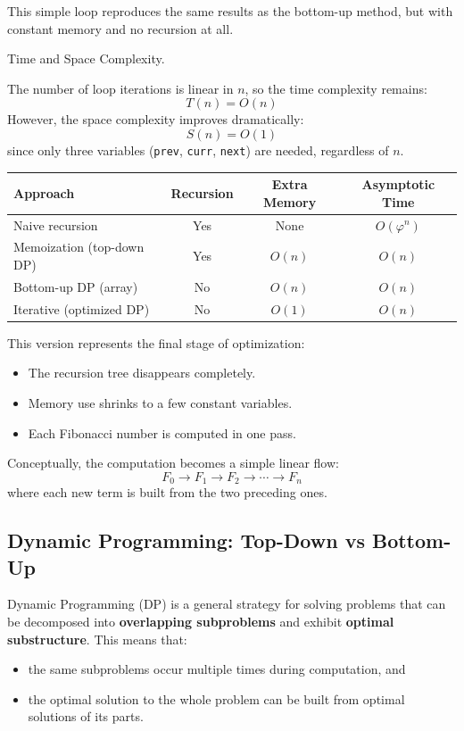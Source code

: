 \documentclass{article}
\begin{document}
This simple loop reproduces the same results as the bottom-up method,
but with constant memory and no recursion at all.

Time and Space Complexity.

The number of loop iterations is linear in $n$,
so the time complexity remains:
\[
	T(n) = O(n)
\]
However, the space complexity improves dramatically:
\[
	S(n) = O(1)
\]
since only three variables (\texttt{prev}, \texttt{curr}, \texttt{next}) are needed, regardless of $n$.

\begin{center}
	\begin{tabular}{lccc}
		\toprule
		\textbf{Approach} & \textbf{Recursion} & \textbf{Extra Memory} & \textbf{Asymptotic Time} \\
		\midrule
		Naive recursion & Yes & None & $O(\varphi^n)$ \\
		Memoization (top-down DP) & Yes & $O(n)$ & $O(n)$ \\
		Bottom-up DP (array) & No & $O(n)$ & $O(n)$ \\
		Iterative (optimized DP) & No & $O(1)$ & $O(n)$ \\
		\bottomrule
	\end{tabular}
\end{center}

This version represents the final stage of optimization:
\begin{itemize}
	\item The recursion tree disappears completely.
	\item Memory use shrinks to a few constant variables.
	\item Each Fibonacci number is computed in one pass.
\end{itemize}

Conceptually, the computation becomes a simple linear flow:
\[
	F_0 \rightarrow F_1 \rightarrow F_2 \rightarrow \cdots \rightarrow F_n
\]
where each new term is built from the two preceding ones.

\subsection{Dynamic Programming: Top-Down vs Bottom-Up}

Dynamic Programming (DP) is a general strategy for solving problems that can be decomposed into
\textbf{overlapping subproblems} and exhibit \textbf{optimal substructure}.
This means that:
\begin{itemize}
	\item the same subproblems occur multiple times during computation, and
	\item the optimal solution to the whole problem can be built from optimal solutions of its parts.
\end{itemize}
\end{document}
